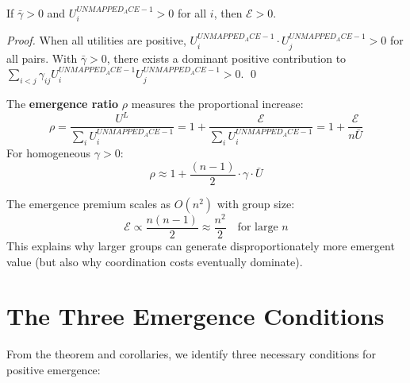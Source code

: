 \begin{corollary}
\label{cor:sufficient}
If $\bar{\gamma} > 0$ and $U^{UNMAPPED_ACE-1}_i > 0$ for all $i$, then $\mathcal{E} > 0$.
\end{corollary}

\begin{proof}
When all utilities are positive, $U^{UNMAPPED_ACE-1}_i \cdot U^{UNMAPPED_ACE-1}_j > 0$ for all pairs.
With $\bar{\gamma} > 0$, there exists a dominant positive contribution to
$\sum_{i<j} \gamma_{ij} U^{UNMAPPED_ACE-1}_i U^{UNMAPPED_ACE-1}_j > 0$. \qed
\end{proof}

\begin{corollary}
\label{cor:ratio}
The \textbf{emergence ratio} $\rho$ measures the proportional increase:
\begin{equation}
\rho = \frac{U^L}{\sum_i U^{UNMAPPED_ACE-1}_i} = 1 + \frac{\mathcal{E}}{\sum_i U^{UNMAPPED_ACE-1}_i} = 1 + \frac{\mathcal{E}}{n \bar{U}}
\label{eq:emergence-ratio}
\end{equation}
For homogeneous $\gamma > 0$:
\begin{equation}
\rho \approx 1 + \frac{(n-1)}{2} \cdot \gamma \cdot \bar{U}
\end{equation}
\end{corollary}

\begin{corollary}
\label{cor:scaling}
The emergence premium scales as $O(n^2)$ with group size:
\begin{equation}
\mathcal{E} \propto \frac{n(n-1)}{2} \approx \frac{n^2}{2} \quad \text{for large } n
\end{equation}
This explains why larger groups can generate disproportionately more emergent value
(but also why coordination costs eventually dominate).
\end{corollary}


\section{The Three Emergence Conditions}
\label{sec:let-conditions}

From the theorem and corollaries, we identify three necessary conditions for
positive emergence:

